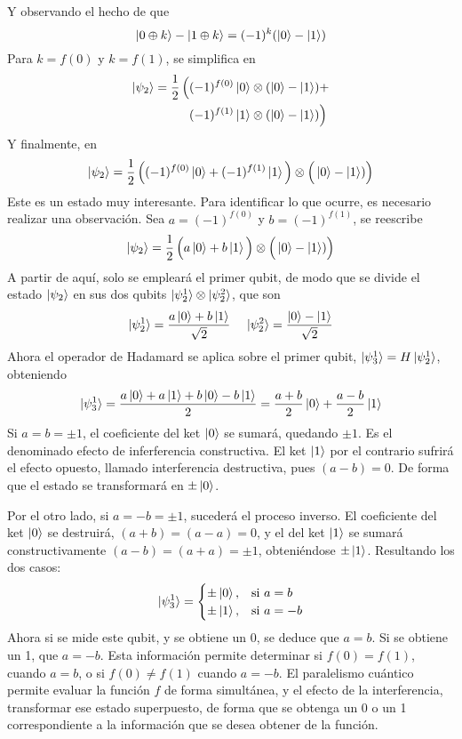 Y observando el hecho de que
$$ \ket{0 \oplus k} - \ket{1 \oplus k} = (-1)^k (\ket 0 - \ket 1) $$
Para $k = f(0)$ y $k = f(1)$, se simplifica en
\begin{equation*}
\begin{split}
\ket{\psi_{2}} = \frac{1}{2} \, \Big(
& (-1)^{f(0)} \ket{0} \otimes (\ket 0 - \ket 1) + \\
& (-1)^{f(1)} \ket{1} \otimes (\ket 0 - \ket 1) \Big)
\end{split}
\end{equation*}
Y finalmente, en
$$
\ket{\psi_{2}} = \frac{1}{2} \, \Big((-1)^{f(0)} \ket{0} + (-1)^{f(1)}\ket 1 \Big) 
\otimes \Big(\ket 0 - \ket 1) \Big)
$$
Este es un estado muy interesante. Para identificar lo que ocurre, es necesario 
realizar una observación. Sea $a = (-1)^{f(0)}$ y $b = (-1)^{f(1)}$, se 
reescribe
$$
\ket{\psi_{2}} = \frac{1}{2} \, \Big(a \ket{0} + b \ket 1 \Big) \otimes \Big(\ket 0 - 
\ket 1) \Big)
$$
A partir de aquí, solo se empleará el primer qubit, de modo que se divide el 
estado $\ket{\psi_{2}}$ en sus dos qubits $\ket{\psi_2^1} \otimes \ket{\psi_2^2}$, que 
son
$$
\ket{\psi_2^1} = \frac {a \ket{0} + b \ket 1}{\sqrt 2}\, \quad
\ket{\psi_2^2} = \frac {\ket 0 - \ket 1}{\sqrt 2}
$$
%
Ahora el operador de Hadamard se aplica sobre el primer qubit, $\ket{\psi_3^1} = 
H \ket{\psi_2^1}$, obteniendo
$$ \ket{\psi_3^1} = \frac{a \ket 0 + a \ket 1 + b \ket 0 - b \ket 1}{2}
= \frac{a+b}{2} \ket 0 + \frac{a-b}{2} \ket 1$$
%
Si $a = b = \pm 1$, el coeficiente del ket $\ket 0$ se sumará, quedando $\pm 1$.  
Es el denominado efecto de inferferencia constructiva. El ket $\ket 1$ por el 
contrario sufrirá el efecto opuesto, llamado interferencia destructiva, pues 
$(a-b) = 0$. De forma que el estado se transformará en $\pm \ket 0$.

Por el otro lado, si $a = -b = \pm 1$, sucederá el proceso inverso. El 
coeficiente del ket $\ket 0$ se destruirá, $(a+b) = (a-a) = 0$, y el del ket 
$\ket 1$ se sumará constructivamente $(a-b) = (a+a) = \pm 1$, obteniéndose $\pm
\ket 1$. Resultando los dos casos:
$$
\ket{\psi_3^1} = \begin{cases}
\pm \ket 0, & \text{si}\ a = b \\
\pm \ket 1, & \text{si}\ a = -b \\
\end{cases}
$$
Ahora si se mide este qubit, y se obtiene un 0, se deduce que $a = b$. Si se 
obtiene un 1, que $a=-b$. Esta información permite determinar si $f(0) = f(1)$, 
cuando $a = b$, o si $f(0) \neq f(1)$ cuando $a=-b$. El paralelismo cuántico 
permite evaluar la función $f$ de forma simultánea, y el efecto de la 
interferencia, transformar ese estado superpuesto, de forma que se obtenga un 0 
o un 1 correspondiente a la información que se desea obtener de la función.

